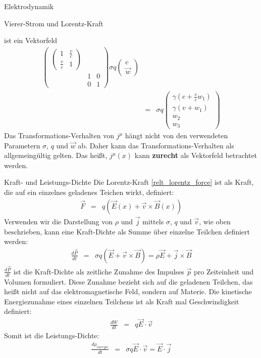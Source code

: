 \begin{chapter}{\titlestr}
\begin{section}{Elektrodynamik}
\begin{subsection}{Vierer-Strom und Lorentz-Kraft}
\begin{subsubsection}{ ist ein Vektorfeld}
\begin{eqnarray*}
\begin{pmatrix}
\begin{pmatrix}
1 & \frac{v}{c}\\
\frac{v}{c} & 1
\end{pmatrix} &   \\
& 1 & 0\\
& 0 & 1
\end{pmatrix}
\sigma q 
\begin{pmatrix}
c\\
\vec{w}
\end{pmatrix}\\
&=&\sigma q 
\begin{pmatrix}
\gamma\left(c+\frac{v}{c}w_1\right)\\
\gamma\left(v+w_1\right)\\
w_2\\
w_3
\end{pmatrix}
\end{eqnarray*}
Das Transformations-Verhalten von $j^\mu$ hängt nicht von den verwendeten Parametern $\sigma$, $q$ und $\vec{w}$ ab.
Daher kann das Transformations-Verhalten als allgemeingültig gelten.
Das heißt, $j^\mu(x)$ kann \textbf{zurecht} als Vektorfeld betrachtet werden.
\end{subsubsection}

\begin{subsubsection}{Kraft- und Leistungs-Dichte}
Die Lorentz-Kraft \ref{relt_lorentz_force} ist als Kraft, die auf ein einzelnes geladenes Teichen wirkt, definiert:
\begin{eqnarray*}
\vec{F} &=& q\left(\vec{E}(x)+\vec{v}\times\vec{B}(x)\right)
\end{eqnarray*}
Verwenden wir die Darstellung von $\rho$ und $\vec{j}$ mittels $\sigma$, $q$ und $\vec{v}$, wie oben beschrieben, kann eine Kraft-Dichte als Summe über einzelne Teilchen definiert werden:
\begin{eqnarray*}
\frac{d\vec{P}}{dt} &=& \sigma q\left(\vec{E}+\vec{v}\times\vec{B}\right)
=\rho\vec{E}+\vec{j}\times \vec{B}
\end{eqnarray*}
$\frac{d\vec{P}}{dt}$ ist die Kraft-Dichte als zeitliche Zunahme des Impulses $\vec{p}$ pro Zeiteinheit und Volumen formuliert.
Diese Zunahme bezieht sich auf die geladenen Teilchen, das heißt nicht auf das elektromagnetische Feld, sondern auf Materie.
Die kinetische Energiezunahme eines einzelnen Teilchens ist als Kraft mal Geschwindigkeit definiert:
\begin{eqnarray*}
\frac{dW}{dt} &=& q\vec{E}\cdot\vec{v}
\end{eqnarray*}
Somit ist die Leistungs-Dichte:
\begin{eqnarray*}
\frac{d\rho_{energie}}{dt} &=& \sigma q\vec{E}\cdot\vec{v} = \vec{E}\cdot\vec{j}
\end{eqnarray*}
\end{subsubsection}
\end{subsection}


\end{section}
\end{chapter}
